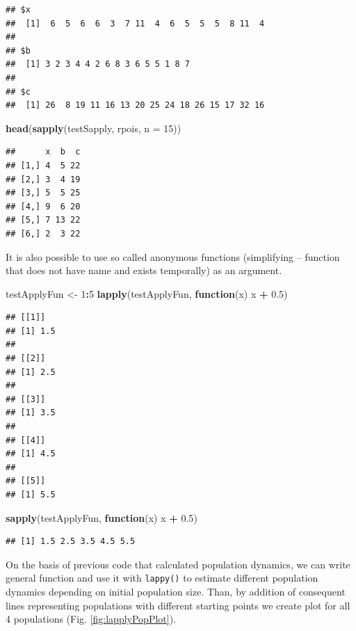 \documentclass[]{book}
\newenvironment{Shaded}{\begin{snugshade}}{\end{snugshade}}
\newcommand{\KeywordTok}[1]{\textcolor[rgb]{0.13,0.29,0.53}{\textbf{#1}}}
\newcommand{\DataTypeTok}[1]{\textcolor[rgb]{0.13,0.29,0.53}{#1}}
\newcommand{\DecValTok}[1]{\textcolor[rgb]{0.00,0.00,0.81}{#1}}
\newcommand{\FloatTok}[1]{\textcolor[rgb]{0.00,0.00,0.81}{#1}}
\newcommand{\StringTok}[1]{\textcolor[rgb]{0.31,0.60,0.02}{#1}}
\newcommand{\ControlFlowTok}[1]{\textcolor[rgb]{0.13,0.29,0.53}{\textbf{#1}}}
\newcommand{\OperatorTok}[1]{\textcolor[rgb]{0.81,0.36,0.00}{\textbf{#1}}}
\newcommand{\NormalTok}[1]{#1}
\theoremstyle{definition}
\theoremstyle{definition}
\theoremstyle{definition}
\theoremstyle{remark}
\begin{document}
\begin{verbatim}
## $x
##  [1]  6  5  6  6  3  7 11  4  6  5  5  5  8 11  4
## 
## $b
##  [1] 3 2 3 4 4 2 6 8 3 6 5 5 1 8 7
## 
## $c
##  [1] 26  8 19 11 16 13 20 25 24 18 26 15 17 32 16
\end{verbatim}

\begin{Shaded}
\begin{Highlighting}[]
\KeywordTok{head}\NormalTok{(}\KeywordTok{sapply}\NormalTok{(testSapply, rpois, }\DataTypeTok{n =} \DecValTok{15}\NormalTok{))}
\end{Highlighting}
\end{Shaded}

\begin{verbatim}
##      x  b  c
## [1,] 4  5 22
## [2,] 3  4 19
## [3,] 5  5 25
## [4,] 9  6 20
## [5,] 7 13 22
## [6,] 2  3 22
\end{verbatim}

It is also possible to use so called anonymous functions (simplifying --
function that does not have name and exists temporally) as an argument.

\begin{Shaded}
\begin{Highlighting}[]
\NormalTok{testApplyFun <-}\StringTok{ }\DecValTok{1}\OperatorTok{:}\DecValTok{5}
\KeywordTok{lapply}\NormalTok{(testApplyFun, }\ControlFlowTok{function}\NormalTok{(x) x }\OperatorTok{+}\StringTok{ }\FloatTok{0.5}\NormalTok{)}
\end{Highlighting}
\end{Shaded}

\begin{verbatim}
## [[1]]
## [1] 1.5
## 
## [[2]]
## [1] 2.5
## 
## [[3]]
## [1] 3.5
## 
## [[4]]
## [1] 4.5
## 
## [[5]]
## [1] 5.5
\end{verbatim}

\begin{Shaded}
\begin{Highlighting}[]
\KeywordTok{sapply}\NormalTok{(testApplyFun, }\ControlFlowTok{function}\NormalTok{(x) x }\OperatorTok{+}\StringTok{ }\FloatTok{0.5}\NormalTok{)}
\end{Highlighting}
\end{Shaded}

\begin{verbatim}
## [1] 1.5 2.5 3.5 4.5 5.5
\end{verbatim}

On the basis of previous code that calculated population dynamics, we
can write general function and use it with \texttt{lappy()} to estimate
different population dynamics depending on initial population size.
Than, by addition of consequent lines representing populations with
different starting points we create plot for all 4 populations (Fig.
\ref{fig:lapplyPopPlot}).
\end{document}
